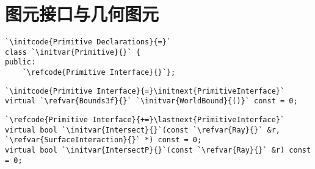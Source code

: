 \section{图元接口与几何图元}\label{sec:图元接口与几何图元}

\begin{lstlisting}
`\initcode{Primitive Declarations}{=}`
class `\initvar{Primitive}{}` {
public:
    `\refcode{Primitive Interface}{}`};
\end{lstlisting}

\begin{lstlisting}
`\initcode{Primitive Interface}{=}\initnext{PrimitiveInterface}`
virtual `\refvar{Bounds3f}{}` `\initvar{WorldBound}{()}` const = 0;
\end{lstlisting}

\begin{lstlisting}
`\refcode{Primitive Interface}{+=}\lastnext{PrimitiveInterface}`
virtual bool `\initvar{Intersect}{}`(const `\refvar{Ray}{}` &r, `\refvar{SurfaceInteraction}{}` *) const = 0;
virtual bool `\initvar{IntersectP}{}`(const `\refvar{Ray}{}` &r) const = 0;
\end{lstlisting}